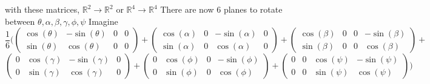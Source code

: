 \documentclass{article}
\begin{document}
with these matrices, $\mathbb{R}^{2}\to\mathbb{R}^2$ or $\mathbb{R}^{4}\to\mathbb{R}^4$
\newline There are now 6 planes to rotate between
\newline $\theta, \alpha, \beta, \gamma, \phi, \psi$
\newline Imagine
\[\frac{1}{6}(\begin{pmatrix}
    \cos(\theta) & -\sin(\theta) & 0 & 0 \\
    \sin(\theta) & \cos(\theta) & 0 & 0
\end{pmatrix}+
\begin{pmatrix}
    \cos(\alpha) & 0 & -\sin(\alpha) & 0 \\
    \sin(\alpha) & 0 & \cos(\alpha) & 0
\end{pmatrix}+
\begin{pmatrix}
    \cos(\beta) & 0 & 0 & -\sin(\beta)\\
    \sin(\beta) & 0 & 0 & \cos(\beta)
\end{pmatrix}+\]
\newline
\[\begin{pmatrix}
    0 & \cos(\gamma) & -\sin(\gamma) & 0 \\
    0 & \sin(\gamma) & \cos(\gamma) & 0
\end{pmatrix}+
\begin{pmatrix}
    0 & \cos(\phi) & 0 & -\sin(\phi) \\
    0 & \sin(\phi) & 0 & \cos(\phi)
\end{pmatrix}+
\begin{pmatrix}
    0 & 0 & \cos(\psi) & -\sin(\psi) \\
    0 & 0 & \sin(\psi) & \cos(\psi)
\end{pmatrix}
)\]
\end{document}
